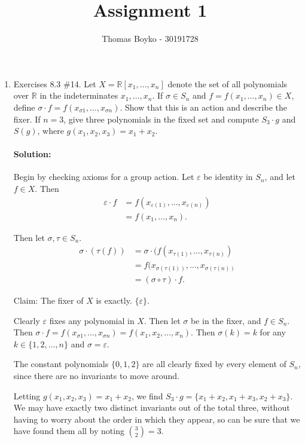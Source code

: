 \documentclass{article}
\title{Assignment 1}
\author{Thomas Boyko - 30191728}
\begin{document}
\maketitle
\begin{enumerate}
\item Exercises 8.3 \#14. Let $X= \mathbb{R}[x_1, \ldots , x_n]$ denote the set of all polynomials over $\mathbb{R}$ in the indeterminates $x_1, \ldots, x_n$.  If $\sigma\in S_n$ and $f=f(x_1, \ldots , x_n)\in X$, define $\sigma\cdot f=f(x_{\sigma 1}, \ldots , x_{\sigma n})$.  Show that this is an action and describe the fixer. If $n=3$, give three polynomials in the fixed set and compute $S_3\cdot g$ and $S(g)$, where $g(x_1, x_2, x_3)=x_1+x_2$.

    \paragraph{Solution: }Begin by checking axioms for a group action. Let $\varepsilon$ be identity in $S_{n}$, and let $f\in X$. Then
    \begin{align*}
        \varepsilon\cdot f&=f(x_{\varepsilon(1)},\ldots,x_{\varepsilon(n)})\\
                          &=f(x_1,\ldots,x_n)
    .\end{align*}

    Then let $\sigma,\tau\in S_n$. 
    \begin{align*}
        \sigma\cdot(\tau(f))&= \sigma\cdot(f(x_{\tau(1)},\ldots,x_{\tau(n)}) \\
        &=  f(x_{\sigma(\tau(1))},\ldots,x_{\sigma(\tau(n))} \\
        &= (\sigma\circ\tau)\cdot f
    .\end{align*}

    Claim: The fixer of $X$ is exactly. $\{\varepsilon\} $.

    Clearly $\varepsilon$ fixes any polynomial in $X$. Then let $\sigma$ be in the fixer, and $f\in S_n$.
    Then $\sigma\cdot f=f(x_{\sigma 1}, \ldots , x_{\sigma n})=f(x_1,x_2,\ldots,x_n)$. Then $\sigma(k)=k$ for any $k\in \{1,2,\ldots ,n\} $ and $\sigma=\varepsilon$.

    The constant polynomials $\{0,1,2\} $ are all clearly fixed by every element of  $S_n$, since there are no invariants to move around.
    
    Letting $g(x_1,x_2,x_3)=x_1+x_2$, we find $S_3\cdot g=\{x_1+x_2,x_1+x_3,x_2+x_3 \}$. We may have exactly two distinct invariants out of the total three, 
    without having to worry about the order in which they appear, so can be sure that we have found them all by noting ${\binom{3}{2}}=3$.


\end{enumerate}
\end{document}
